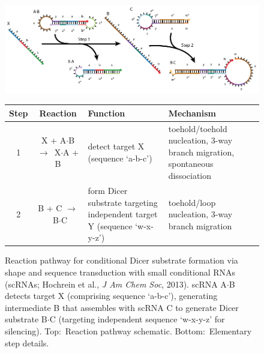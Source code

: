 \documentclass[11pt]{article}
\newcommand{\plex}{$\cdot$}
\newcommand{\unidir}{$\rightarrow$~}
\begin{document}
\begin{figure}
\centering
\includegraphics[]{./figs/pathway-dicer}
\bigskip
\begin{footnotesize}
\begin{tabular}{ccp{2.2in}p{2.3in}}
\toprule
Step & Reaction & Function  & Mechanism \\ \midrule
1 & X + A\plex B \unidir  X\plex A + B& detect target X (sequence `a-b-c') & toehold/toehold nucleation, 3-way branch migration, spontaneous dissociation\\
2& B + C \unidir B\plex C  & form Dicer substrate targeting independent target Y (sequence `w-x-y-z') & toehold/loop nucleation, 3-way branch migration\\ 
\bottomrule
\end{tabular}
\end{footnotesize}
\bigskip
\caption{Reaction pathway for conditional Dicer substrate formation via shape and sequence transduction with small conditional RNAs (scRNAs; Hochrein et al., {\it J Am Chem Soc}, 2013). 
scRNA A\plex B detects target X (comprising sequence `a-b-c'), generating intermediate B that assembles with scRNA C to generate Dicer substrate B\plex C (targeting independent sequence `w-x-y-z' for silencing). Top:~Reaction pathway schematic.  Bottom:~Elementary step details. 
\label{fig:dicer-pathway}
    }
\end{figure}
\end{document}
